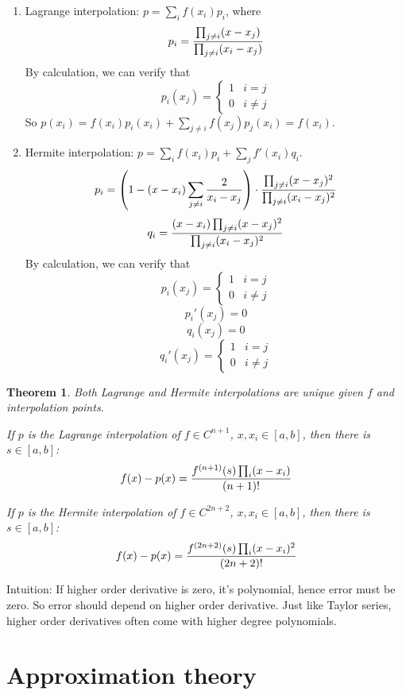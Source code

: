 \documentclass[20pt]{article} %
\theoremstyle{break}
\newtheorem{thm}[definition]{Theorem}
\begin{document}
\begin{enumerate}
\item Lagrange interpolation: $p=\sum_if(x_i)p_i$, where
  \[p_i={\prod_{j\not=i}(x-x_j)\over \prod_{j\not=i}(x_i-x_j)}\]
  By calculation, we can verify that
  \[p_i(x_j)=\begin{cases}1 & i=j\\0 & i\not=j\end{cases}\]
  So $p(x_i)=f(x_i)p_i(x_i)+\sum_{j\not=i}f(x_j)p_j(x_i)=f(x_i)$.
\item Hermite interpolation: $p=\sum_if(x_i)p_i+\sum_jf'(x_i)q_i$.
  \[p_i=\left(1-(x-x_i)\sum_{j\not=i}{2\over x_i-x_j}\right)\cdot {\prod_{j\not=i}(x-x_j)^2\over \prod_{j\not=i}(x_i-x_j)^2}\]
  \[q_i={(x-x_i)\prod_{j\not=i}(x-x_j)^2\over \prod_{j\not=i}(x_i-x_j)^2}\]
  By calculation, we can verify that
  \[p_i(x_j)=\begin{cases}1 & i=j\\0 & i\not=j\end{cases}\]
  \[p_i'(x_j)=0\]
  \[q_i(x_j)=0\]
  \[q_i'(x_j)=\begin{cases}1 & i=j\\0 & i\not=j\end{cases}\]
\end{enumerate}

\newpage

\begin{thm}
\item Both Lagrange and Hermite interpolations are unique given $f$ and interpolation points.
\item If $p$ is the Lagrange interpolation of $f\in C^{n+1}$, $x, x_i\in [a, b]$, then there is $s\in [a, b]$:
  \[f(x)-p(x)={f^{(n+1)}(s)\prod_i(x-x_i)\over (n+1)!}\]
\item If $p$ is the Hermite interpolation of $f\in C^{2n+2}$, $x, x_i\in [a, b]$, then there is $s\in [a, b]$:
  \[f(x)-p(x)={f^{(2n+2)}(s)\prod_i(x-x_i)^2\over (2n+2)!}\]  
\end{thm}

Intuition: If higher order derivative is zero, it's polynomial, hence error must be zero. So error should depend on higher order derivative. Just like Taylor series, higher order derivatives often come with higher degree polynomials.

\newpage

\section{Approximation theory}
\end{document}
